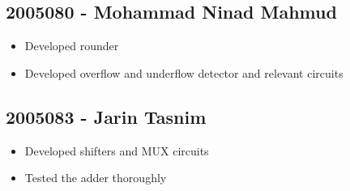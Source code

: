 \documentclass[14pt]{article}
\begin{document}
\subsection*{2005080 - Mohammad Ninad Mahmud}
\begin{itemize}
	\item Developed rounder
	\item Developed overflow and underflow detector and relevant circuits
\end{itemize}
\subsection*{2005083 - Jarin Tasnim}
\begin{itemize}
	\item Developed shifters and MUX circuits
	\item Tested the adder thoroughly
\end{itemize}
\end{document}

